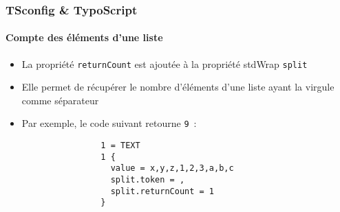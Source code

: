 \begin{frame}[fragile]
	\frametitle{TSconfig \& TypoScript}
	\framesubtitle{Compte des éléments d'une liste}

	\lstset{basicstyle=\tiny\ttfamily}

	\begin{itemize}

		\item La propriété \texttt{returnCount} est ajoutée à la propriété stdWrap \texttt{split}

		\item Elle permet de récupérer le nombre d'éléments d'une liste ayant la virgule comme séparateur

		\item Par exemple, le code suivant retourne \texttt{9}~:

			\begin{lstlisting}
				1 = TEXT
				1 {
				  value = x,y,z,1,2,3,a,b,c
				  split.token = ,
				  split.returnCount = 1
				}
			\end{lstlisting}

	\end{itemize}

\end{frame}

